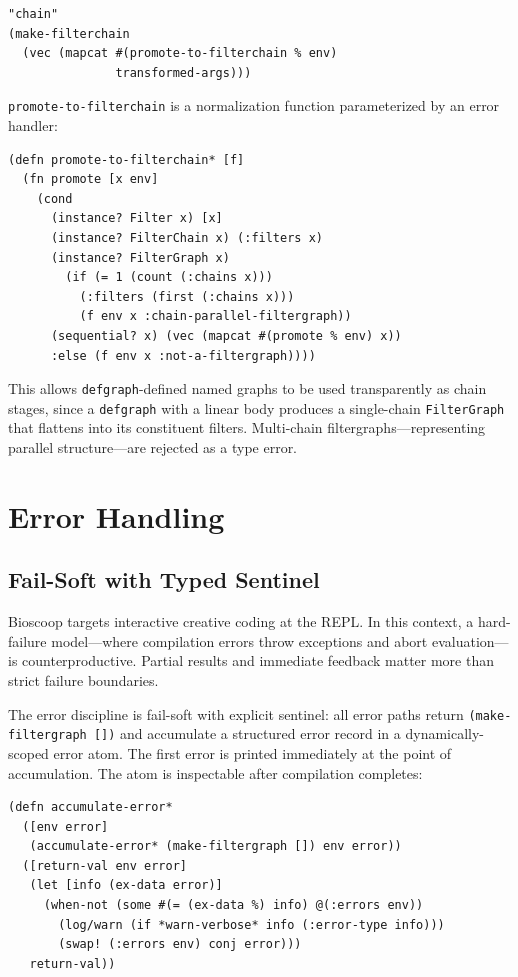 \documentclass[english,submission]{programming}
\begin{document}
\begin{lstlisting}[caption={chain flattening via promote-to-filterchain}]
"chain"
(make-filterchain
  (vec (mapcat #(promote-to-filterchain % env)
               transformed-args)))
\end{lstlisting}

\texttt{promote-to-filterchain} is a normalization function parameterized by an error handler:

\begin{lstlisting}[caption={promote-to-filterchain* factory}]
(defn promote-to-filterchain* [f]
  (fn promote [x env]
    (cond
      (instance? Filter x) [x]
      (instance? FilterChain x) (:filters x)
      (instance? FilterGraph x)
        (if (= 1 (count (:chains x)))
          (:filters (first (:chains x)))
          (f env x :chain-parallel-filtergraph))
      (sequential? x) (vec (mapcat #(promote % env) x))
      :else (f env x :not-a-filtergraph))))
\end{lstlisting}

This allows \texttt{defgraph}-defined named graphs to be used transparently as chain stages, since a \texttt{defgraph} with a linear body produces a single-chain \texttt{FilterGraph} that flattens into its constituent filters. Multi-chain filtergraphs---representing parallel structure---are rejected as a type error.

\section{Error Handling}

\subsection{Fail-Soft with Typed Sentinel}

Bioscoop targets interactive creative coding at the REPL. In this context, a hard-failure model---where compilation errors throw exceptions and abort evaluation---is counterproductive. Partial results and immediate feedback matter more than strict failure boundaries.

The error discipline is fail-soft with explicit sentinel: all error paths return \texttt{(make-filtergraph [])} and accumulate a structured error record in a dynamically-scoped error atom. The first error is printed immediately at the point of accumulation. The atom is inspectable after compilation completes:

\begin{lstlisting}[caption={Error accumulation with deduplication}]
(defn accumulate-error*
  ([env error]
   (accumulate-error* (make-filtergraph []) env error))
  ([return-val env error]
   (let [info (ex-data error)]
     (when-not (some #(= (ex-data %) info) @(:errors env))
       (log/warn (if *warn-verbose* info (:error-type info)))
       (swap! (:errors env) conj error)))
   return-val))
\end{lstlisting}
\end{document}
